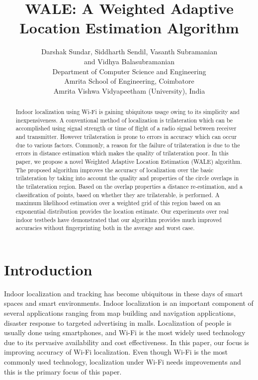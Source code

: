 \documentclass[twocolumn, 11pt]{IEEEtran}
\begin{document}
%
\title{\vspace{-0.5in} WALE: A Weighted Adaptive Location Estimation Algorithm}
\author{Darshak Sundar, Siddharth Sendil, Vasanth Subramanian\\ and Vidhya Balasubramanian \\Department of Computer Science and Engineering\\Amrita School of Engineering, Coimbatore\\ Amrita Vishwa Vidyapeetham (University), India}
\maketitle


\begin{abstract}

Indoor localization using Wi-Fi is gaining ubiquitous usage owing to its simplicity and inexpensiveness. A conventional method of localization is trilateration which can be accomplished using signal strength or time of flight of a radio signal between receiver and transmitter. However trilateration is prone to errors in accuracy which can occur due to various factors. Commonly, a reason for the failure of trilateration is due to the errors in distance estimation which makes the quality of trilateration poor. In this paper, we propose a novel  Weighted Adaptive Location Estimation (WALE) algorithm. The proposed algorithm improves the accuracy of localization over the basic trilateration by taking into account the quality and properties of the circle overlaps in the trilateration region. Based on the overlap properties a distance re-estimation, and a classification of points, based on whether they are trilaterable, is performed. A maximum likelihood estimation over a weighted grid of this region based on an exponential distribution provides the location estimate. Our experiments over real indoor testbeds have demonstrated that our algorithm provides much improved accuracies without fingerprinting both in the average and worst case. 
\end{abstract}

\section{Introduction}
Indoor localization and tracking has become ubiquitous in these days of smart spaces and smart environments. Indoor localization is an important component of several applications ranging from map building and navigation applications, disaster response to targeted advertising in malls. Localization of people is usually done using smartphones, and Wi-Fi is the most widely used technology due to its pervasive availability and cost effectiveness. In this paper, our focus is improving accuracy of Wi-Fi localization. Even though Wi-Fi is the most commonly used technology, localization under Wi-Fi needs improvements and this is the primary focus of this paper. 
\end{document}
